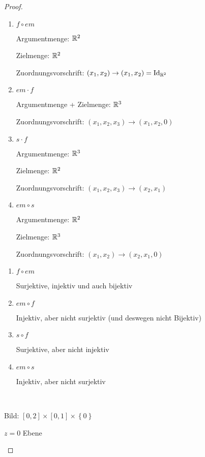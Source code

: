 \begin{proof}
	\begin{parts}
		\item
		\begin{enumerate}[label=(\roman*)]
			\item $f\circ em$
			
			
			Argumentmenge: $\mathbb{R}^2$
			
			Zielmenge: $\mathbb{R}^2$
			
			Zuordnungsvorschrift:  $(x_1,x_2)\to (x_1,x_2)=\text{Id}_{\mathbb{R}^2}$
			
			\item $em \cdot f$
			
			Argumentmenge + Zielmenge:  $\mathbb{R}^3$ 
			
			Zuordnungsvorschrift: $(x_1,x_2,x_3)\to (x_1,x_2,0)$ 
			
			\item $s\cdot f$ 
			
			Argumentmenge: $\mathbb{R}^3$ 
			
			Zielmenge: $\mathbb{R}^2$ 
			
			Zuordnungsvorschrift: $(x_1,x_2,x_3)\to (x_2,x_1)$
			\item $em\circ s$
			
			Argumentmenge:  $\mathbb{R}^2$
			
			Zielmenge:  $\mathbb{R}^3$
			
			Zuordnungsvorschrift:  $(x_1,x_2)\to (x_2,x_1,0)$
		\end{enumerate}
		\item
		\begin{enumerate}[label=(\roman*)]
			\item $f\circ em$
			
			Surjektive, injektiv und auch bijektiv
			
			\item $em\circ f$ 
			
			Injektiv, aber nicht surjektiv (und deswegen nicht Bijektiv)
			
			\item $s\circ f$ 
			
			Surjektive, aber nicht injektiv
			
			\item $em\circ s$ 
			
			Injektiv, aber nicht surjektiv
		\end{enumerate}
	\item \noindent \\


		\begin{minipage}{0.4\textwidth}
			Bild: $[0,2]\times [0,1]\times \left\{ 0 \right\} $ 
			\begin{center}
				$z=0$ Ebene



\end{center}
\end{minipage}
\end{parts}
\end{proof}
